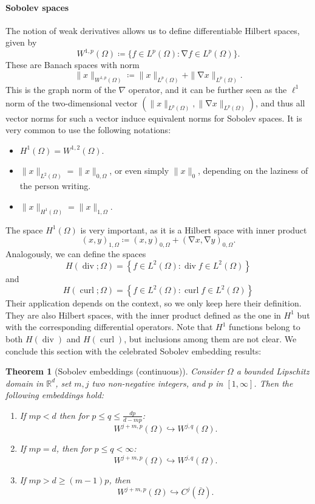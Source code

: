 \documentclass{article}
\DeclareMathOperator{\grad}{\nabla}
\DeclareMathOperator{\dive}{\text{div}}
\DeclareMathOperator{\curl}{\text{curl}}
\newcommand{\R}{\mathbb{R}}
\newtheorem{theorem}{Theorem}
\begin{document}
\paragraph{Sobolev spaces} The notion of weak derivatives allows us to define differentiable Hilbert spaces, given by 
    $$ W^{1,p}(\Omega) \coloneqq \{ f\in L^p(\Omega): \grad f \in L^p(\Omega)\}. $$
These are Banach spaces with norm
    $$ \| x \|_{W^{1,p}(\Omega)} \coloneqq \| x \|_{L^p(\Omega)} + \| \grad x \|_{L^p(\Omega)}. $$
This is the graph norm of the $\nabla$ operator, and it can be further seen as the $\ell^1$ norm of the two-dimensional vector $(\|x\|_{L^p(\Omega)}, \|\grad x\|_{L^p(\Omega)})$, and thus all vector norms for such a vector induce equivalent norms for Sobolev spaces. It is very common to use the following notations:   
    \begin{itemize}
        \item $H^1(\Omega) = W^{1,2}(\Omega)$.
        \item $\| x \|_{L^2(\Omega)} = \| x \|_{0,\Omega}$, or even simply $ \| x\|_0$, depending on the laziness of the person writing.
        \item $\| x \|_{H^1(\Omega)} = \|x\|_{1,\Omega}$.
    \end{itemize}
The space $H^1(\Omega)$ is very important, as it is a Hilbert space with inner product
    $$ (x,y)_{1,\Omega} \coloneqq (x,y)_{0,\Omega} + (\grad x, \grad y)_{0,\Omega}. $$
Analogously, we can define the spaces
    $$ H(\dive; \Omega) = \left\{f\in L^2(\Omega): \dive f \in L^2(\Omega)\right\} $$
and    
    $$ H(\curl; \Omega) = \left\{f\in L^2(\Omega): \curl f \in L^2(\Omega)\right\}$$
Their application depends on the context, so we only keep here their definition. They are also Hilbert spaces, with the inner product defined as the one in $H^1$ but with the corresponding differential operators. Note that $H^1$ functions belong to both $H(\dive)$ and $H(\curl)$, but inclusions among them are not clear. We conclude this section with the celebrated Sobolev embedding results: 

\begin{theorem}[Sobolev embeddings (continuous)]
    Consider $\Omega$ a bounded Lipschitz domain in $\R^d$, set $m,j$ two non-negative integers, and $p$ in $[1,\infty]$. Then the following embeddings hold: 
    \begin{enumerate}
        \item If $mp < d$ then for $p \leq q \leq \frac{dp}{d-mp}$:
            $$ W^{j+m, p}(\Omega) \hookrightarrow W^{j,q}(\Omega). $$
        \item If $mp = d$, then for $p \leq q < \infty$:
            $$ W^{j+m, p}(\Omega) \hookrightarrow W^{j,q}(\Omega). $$
        \item If $mp > d \geq (m-1)p$, then 
            $$ W^{j+m,p}(\Omega) \hookrightarrow C^j(\bar\Omega). $$
    \end{enumerate}
\end{theorem}
\end{document}
